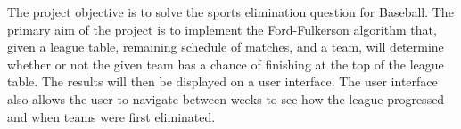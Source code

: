 The project objective is to solve the sports elimination question for Baseball.
The primary aim of the project is to implement the Ford-Fulkerson algorithm
that, given a league table, remaining schedule of matches, and a team, will
determine whether or not the given team has a chance of finishing at the top of
the league table. The results will then be displayed on a user interface. The
user interface also allows the user to navigate between weeks to see how the
league progressed and when teams were first eliminated.
